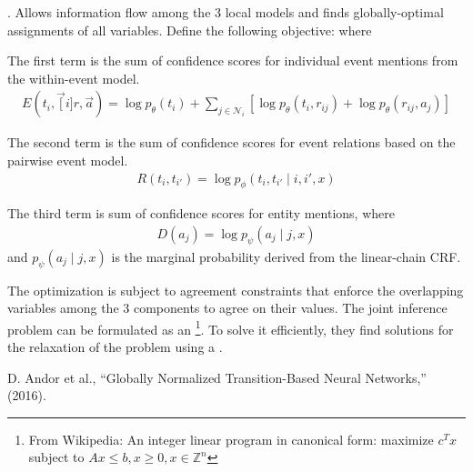 \documentclass[11pt]{article}
\begin{document}
\myspace
\p {}. Allows information flow among the 3 local models and finds globally-optimal assignments of all variables. Define the following objective:
where
\begin{compactitem}
	\item The first term is the sum of confidence scores for individual event mentions from the within-event model. 
	\begin{align}
	E(t_i, \vec[i]{r}, \vec{a})
	= \log p_{\theta}(t_i) + \sum_{j \in \mathcal{N}_i} \left[ \log p_{\theta}(t_i, r_{ij}) + \log p_{\theta}(r_{ij}, a_j) \right]
	\end{align}
	
	\item The second term is the sum of confidence scores for event relations based on the pairwise event model.
	\begin{align}
	R(t_i, t_{i'}) = \log p_{\phi}(t_i, t_{i'} \mid i, i', x)
	\end{align}
	
	\item The third term is sum of confidence scores for entity mentions, where
	\begin{align}
	D(a_j) = \log p_{\psi}(a_j \mid j, x)
	\end{align}
	and $p_{\psi}(a_j \mid j, x)$ is the marginal probability derived from the linear-chain CRF. 
\end{compactitem}
The optimization is subject to agreement constraints that enforce the overlapping variables among the 3 components to agree on their values. The joint inference problem can be formulated as an \footnote{From Wikipedia: An integer linear program in canonical form: maximize $c^T x$ subject to $A x \le b, x \ge 0, x \in \mathbb{Z}^n$}. To solve it efficiently, they find solutions for the relaxation of the problem using a . 




\vspace{-1em}
{\footnotesize D. Andor et al., ``Globally Normalized Transition-Based Neural Networks,'' (2016).}
\end{document}
